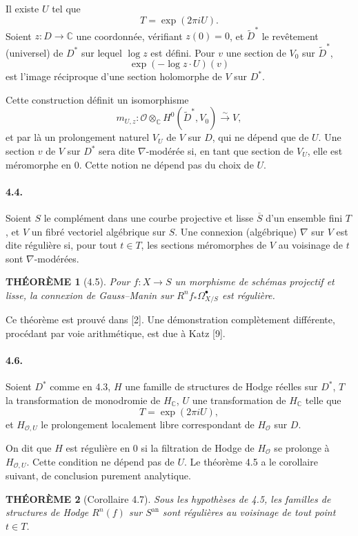 \documentclass[10pt]{article}
\newcommand{\C}{\mathbb C}
\newcommand{\cO}{\mathcal O}
\theoremstyle{deligne}
\newtheorem*{theoreme}{THÉORÈME}
\begin{document}
Il existe $U$ tel que
\[
  T=\exp(2\pi iU).
\]
Soient $z:D\to\C$ une coordonnée, vérifiant $z(0)=0$, et $\widetilde D^*$ le revêtement (universel) de $D^*$ sur lequel $\log z$ est défini. Pour $v$ une section de $V_0$ sur $\widetilde D^*$,
\[
  \exp(-\log z\cdot U)(v)
\]
est l'image réciproque d'une section holomorphe de $V$ sur $D^*$.

Cette construction définit un isomorphisme
\[
  m_{U,z}:\cO\otimes_\C H^0(\widetilde D^*,V_0)
  \xrightarrow{\sim} V,
\]
et par là un prolongement naturel $V_U$ de $V$ sur $D$, qui ne dépend que de $U$. Une section $v$ de $V$ sur $D^*$ sera dite $\nabla$-modérée si, en tant que section de $V_U$, elle est méromorphe en $0$. Cette notion ne dépend pas du choix de $U$.

\paragraph{4.4.}
Soient $S$ le complément dans une courbe projective et lisse $\overline S$ d'un ensemble fini $T$, et $V$ un fibré vectoriel algébrique sur $S$. Une connexion (algébrique) $\nabla$ sur $V$ est dite régulière si, pour tout $t\in T$, les sections méromorphes de $V$ au voisinage de $t$ sont $\nabla$-modérées.

\begin{theoreme}[4.5]
Pour $f:X\to S$ un morphisme de schémas projectif et lisse, la connexion de Gauss--Manin sur $R^n f_*\Omega^\bullet_{X/S}$ est régulière.
\end{theoreme}

Ce théorème est prouvé dans [2]. Une démonstration complètement différente, procédant par voie arithmétique, est due à Katz [9].

\paragraph{4.6.}
Soient $D^*$ comme en 4.3, $H$ une famille de structures de Hodge réelles sur $D^*$, $T$ la transformation de monodromie de $H_\C$, $U$ une transformation de $H_\C$ telle que
\[
  T=\exp(2\pi iU),
\]
et $H_{\cO,U}$ le prolongement localement libre correspondant de $H_\cO$ sur $D$.

On dit que $H$ est régulière en $0$ si la filtration de Hodge de $H_\cO$ se prolonge à $H_{\cO,U}$. Cette condition ne dépend pas de $U$. Le théorème 4.5 a le corollaire suivant, de conclusion purement analytique.

\begin{theoreme}[Corollaire 4.7]
Sous les hypothèses de 4.5, les familles de structures de Hodge $R^n(f)$ sur $S^{\mathrm{an}}$ sont régulières au voisinage de tout point $t\in T$.
\end{theoreme}
\end{document}
